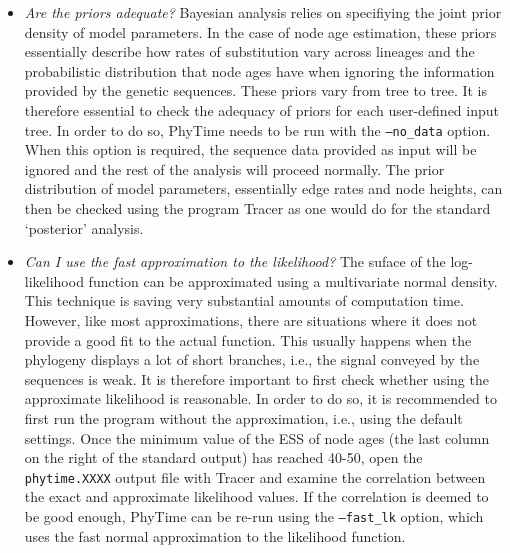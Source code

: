 \documentclass[a4paper,12pt]{article}
\newcommand{\x}[1]{\texttt{#1}}
\begin{document}
\begin{itemize} 
\item {\em  Are the priors adequate?} Bayesian  analysis relies on  specifiying the joint
prior density  of model parameters.  In  the case of  node age estimation, these  priors essentially
describe how rates of substitution vary across lineages and the probabilistic distribution that node
ages have when  ignoring the information provided  by the genetic sequences. These  priors vary from
tree to tree. It is therefore essential to  check the adequacy of priors for each user-defined input
tree. In order to do so, PhyTime needs to be run with the \x{--no\_data} option. When this option is
required, the  sequence data provided  as input will  be ignored and the  rest of the  analysis will
proceed  normally. The  prior distribution  of  model parameters,  essentially edge  rates and  node
heights, can then be  checked using the program Tracer as one would  do for the standard `posterior'
analysis.

\item {\em  Can I use the  fast approximation to the  likelihood?} The suface  of the log-likelihood
function can  be approximated using  a multivariate normal  density.  This technique is  saving very
substantial amounts  of computation  time. However, like  most approximations, there  are situations
where it does not provide a good fit to the actual function. This usually happens when the phylogeny
displays  a lot  of short  branches, i.e.,  the  signal conveyed  by the  sequences is  weak. It  is
therefore important to first check whether  using the approximate likelihood is reasonable. In order
to do  so, it is  recommended to first  run the program without  the approximation, i.e.,  using the
default settings. Once  the minimum value of the ESS  of node ages (the last column  on the right of
the  standard output)  has reached  40-50, open  the \x{phytime.XXXX}  output file  with  Tracer and
examine the correlation  between the exact and approximate likelihood values.  If the correlation is
deemed to be good enough, PhyTime can be re-run using the \x{--fast\_lk} option, which uses the fast
normal approximation to the likelihood function.





\end{itemize}
\end{document}
